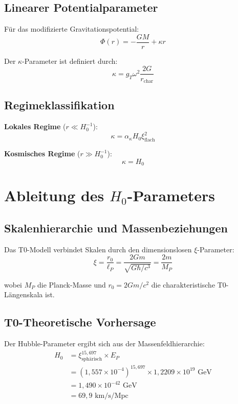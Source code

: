 \documentclass[12pt,a4paper]{article}
\begin{document}
	\subsection{Linearer Potentialparameter}
	Für das modifizierte Gravitationspotential:
	\begin{equation}
		\Phi(r) = -\frac{GM}{r} + \kappa r
	\end{equation}
	
	Der $\kappa$-Parameter ist definiert durch:
	\begin{equation}
		\kappa = g_T \omega^2 \frac{2G}{r_{\text{char}}}
	\end{equation}
	
	\subsection{Regimeklassifikation}
	\textbf{Lokales Regime} ($r \ll H_0^{-1}$):
	\begin{equation}
		\kappa = \alpha_\kappa H_0 \xi_{\text{flach}}^2
	\end{equation}
	
	\textbf{Kosmisches Regime} ($r \gg H_0^{-1}$):
	\begin{equation}
		\boxed{\kappa = H_0}
	\end{equation}
	
	\section{Ableitung des $H_0$-Parameters}
	
	\subsection{Skalenhierarchie und Massenbeziehungen}
	Das T0-Modell verbindet Skalen durch den dimensionslosen $\xi$-Parameter:
	\begin{equation}
		\xi = \frac{r_0}{\ell_P} = \frac{2Gm}{\sqrt{G\hbar/c^3}} = \frac{2m}{M_P}
	\end{equation}
	
	wobei $M_P$ die Planck-Masse und $r_0 = 2Gm/c^2$ die charakteristische T0-Längenskala ist.
	
	\subsection{T0-Theoretische Vorhersage}
	Der Hubble-Parameter ergibt sich aus der Massenfeldhierarchie:
	\begin{align}
		H_0 &= \xi_{\text{sphärisch}}^{15{,}697} \times E_P \\
		&= (1{,}557 \times 10^{-4})^{15{,}697} \times 1{,}2209 \times 10^{19} \text{ GeV} \\
		&= 1{,}490 \times 10^{-42} \text{ GeV} \\
		&= \boxed{69{,}9 \text{ km/s/Mpc}}
	\end{align}
	
\end{document}
